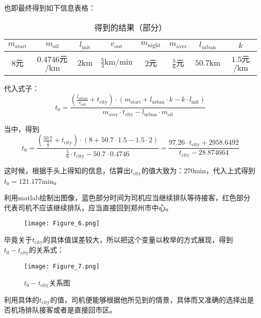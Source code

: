 \documentclass[withoutpreface,bwprint]{cumcmthesis} %
\begin{document}
也即最终得到如下信息表格：\par
\begin{table}[!htbp]
	\caption[标签名]{得到的结果（部分）}
	\begin{tabular}{c|c|c|c|c|c|c|c}
		\toprule[1.5pt]
		$m_{\mathrm{start}}$ & $m_{\mathrm{oil}}$       & $l_{\mathrm{init}}$ & $v_{\mathrm{out}}$            & $m_{\mathrm{night}}$ & $m_{\mathrm{aver}}$ & $l_{\mathrm{urban}}$ & $k$                    \\
		\midrule[1pt]
		8元                  & $0.4746$元$\mathrm{/km}$ & $2\mathrm{km}$      & $ \frac{5}{3}\mathrm{km/min}$ & $2$元                & $\frac{5}{6}$元     & $50.7\mathrm{km}$    & $ 1.5$元$\mathrm{/km}$ \\
		\bottomrule[1.5pt]
	\end{tabular}
\end{table}
代入式子：
$$
	t_0 = \frac{\left(\frac{l_{\mathrm{urban}}}{v_{\mathrm{out}}}+t_{\mathrm{city}}\right)\cdot \left(m_{\mathrm{start}}+ l_{\mathrm{urban}}\cdot k -k\cdot l_{\mathrm{init}} \right)}{ m_{\mathrm{aver}}\cdot t_{\mathrm{city}}-l_{\mathrm{urban}}\cdot m_{\mathrm{oil}}}
$$\par
当中，得到
$$
	t_0 = \frac{\left(\frac{50.7}{\frac{5}{3}}+t_{\mathrm{city}}\right)\cdot \left(8+50.7\cdot 1.5 -1.5\cdot 2 \right)}{ \frac{5}{6}\cdot t_{\mathrm{city}}-50.7\cdot 0.4746}=\frac{97.26\cdot t_{\mathrm{city}}+2958.6492}{ t_{\mathrm{city}} -28.874664}
$$\par
这时候，根据手头上得知的信息，估算出$ t_{\mathrm{city}}$的值大致为：$270\mathrm{min}$，代入上式得到$t_0=121.177\mathrm{min}$。\par 
利用matlab绘制出图像，蓝色部分时间为司机应当继续排队等待接客，红色部分代表司机不应该继续排队，应当直接回到郑州市中心。\par 
\begin{figure}[!h]
	\centering
	\texttt{[image: Figure\_6.png]}
	\caption{}
\end{figure}
\newpage 
毕竟关于$ t_{\mathrm{city}}$的具体值误差较大，所以把这个变量以枚举的方式展现，得到$t_0 - t_{\mathrm{city}}$的关系式：\par 
\begin{figure}[!h]
	\centering
	\texttt{[image: Figure\_7.png]}
	\caption{$t_0 - t_{\mathrm{city}}$关系图}
\end{figure}
利用具体的$t_{\mathrm{city}}$的值，司机便能够根据他所见到的情景，具体而又准确的选择出是否机场排队接客或者是直接回市区。\par 
\end{document}
